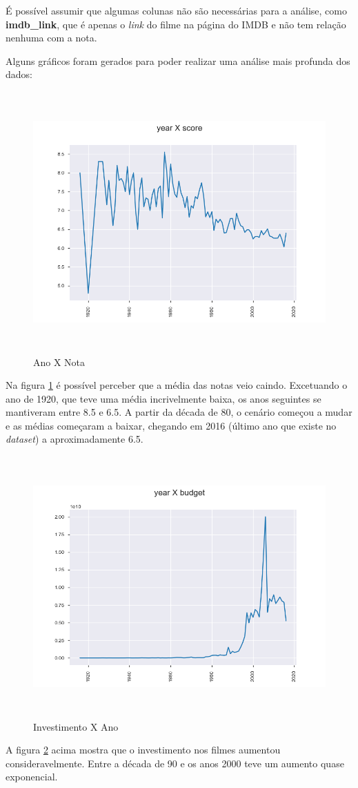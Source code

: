 É possível assumir que algumas colunas não são necessárias para a análise, como \textbf{imdb\_link}, que é apenas o \textit{link} do filme na página do IMDB e não tem relação nenhuma com a nota.

Alguns gráficos foram gerados para poder realizar uma análise mais profunda dos dados: 

\begin{figure}[H]
\centering
\includegraphics[height=10cm]{imagens/yearXscore.png}
\caption{Ano X Nota}
\label{yearXscore}
\end{figure}

Na figura \ref{yearXscore} é possível perceber que a média das notas veio caindo. Excetuando o ano de 1920, que teve uma média incrivelmente baixa, os anos seguintes se mantiveram entre 8.5 e 6.5. A partir da década de 80, o cenário começou a mudar e as médias começaram a baixar, chegando em 2016 (último ano que existe no \textit{dataset}) a aproximadamente 6.5.

\begin{figure}[H]
\centering
\includegraphics[height=10cm]{imagens/yearXbudget.png}
\caption{Investimento X Ano}
\label{budgetXyear}
\end{figure}
A figura \ref{budgetXyear} acima mostra que o investimento nos filmes aumentou consideravelmente. Entre a década de 90 e os anos 2000 teve um aumento quase exponencial.

